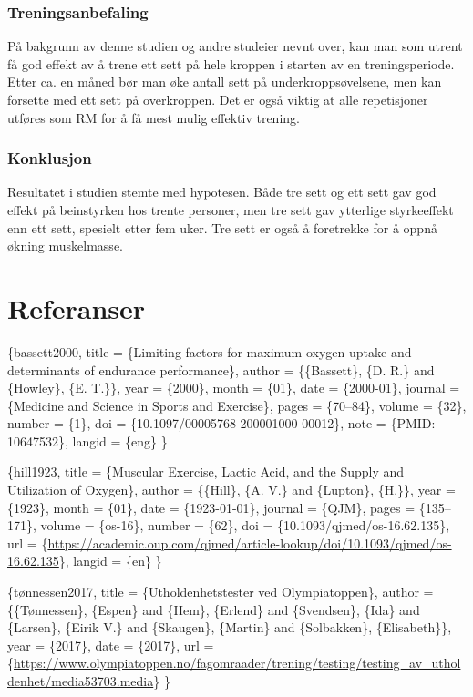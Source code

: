 \documentclass[
]{book}
\begin{document}
\hypertarget{treningsanbefaling}{%
\subsection{Treningsanbefaling}\label{treningsanbefaling}}

På bakgrunn av denne studien og andre studeier nevnt over, kan man som utrent få god effekt av å trene ett sett på hele kroppen i starten av en treningsperiode. Etter ca. en måned bør man øke antall sett på underkroppsøvelsene, men kan forsette med ett sett på overkroppen. Det er også viktig at alle repetisjoner utføres som RM for å få mest mulig effektiv trening.

\hypertarget{konklusjon}{%
\subsection{Konklusjon}\label{konklusjon}}

Resultatet i studien stemte med hypotesen. Både tre sett og ett sett gav god effekt på beinstyrken hos trente personer, men tre sett gav ytterlige styrkeeffekt enn ett sett, spesielt etter fem uker. Tre sett er også å foretrekke for å oppnå økning muskelmasse.

\hypertarget{referanser}{%
\chapter{Referanser}\label{referanser}}

\citet{article}\{bassett2000,
title = \{Limiting factors for maximum oxygen uptake and determinants of endurance performance\},
author = \{\{Bassett\}, \{D. R.\} and \{Howley\}, \{E. T.\}\},
year = \{2000\},
month = \{01\},
date = \{2000-01\},
journal = \{Medicine and Science in Sports and Exercise\},
pages = \{70--84\},
volume = \{32\},
number = \{1\},
doi = \{10.1097/00005768-200001000-00012\},
note = \{PMID: 10647532\},
langid = \{eng\}
\}

\citet{article}\{hill1923,
title = \{Muscular Exercise, Lactic Acid, and the Supply and Utilization of Oxygen\},
author = \{\{Hill\}, \{A. V.\} and \{Lupton\}, \{H.\}\},
year = \{1923\},
month = \{01\},
date = \{1923-01-01\},
journal = \{QJM\},
pages = \{135--171\},
volume = \{os-16\},
number = \{62\},
doi = \{10.1093/qjmed/os-16.62.135\},
url = \{\url{https://academic.oup.com/qjmed/article-lookup/doi/10.1093/qjmed/os-16.62.135}\},
langid = \{en\}
\}

\citet{article}\{tønnessen2017,
title = \{Utholdenhetstester ved Olympiatoppen\},
author = \{\{Tønnessen\}, \{Espen\} and \{Hem\}, \{Erlend\} and \{Svendsen\}, \{Ida\} and \{Larsen\}, \{Eirik V.\} and \{Skaugen\}, \{Martin\} and \{Solbakken\}, \{Elisabeth\}\},
year = \{2017\},
date = \{2017\},
url = \{\url{https://www.olympiatoppen.no/fagomraader/trening/testing/testing_av_utholdenhet/media53703.media}\}
\}
\end{document}
